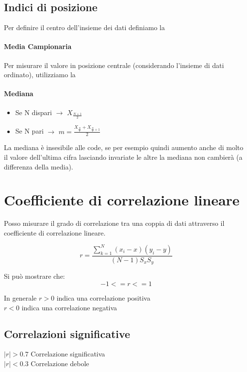 \documentclass[12pt, a4paper, openany]{book}
\begin{document}
\subsection{Indici di posizione}
Per definire il centro dell'insieme dei dati definiamo la 
\paragraph{\textbf{Media Campionaria}}  %

Per misurare il valore in posizione centrale (considerando l'insieme di dati ordinato), utilizziamo la
\paragraph{\textbf{Mediana}}
\begin{itemize}
    \item Se N dispari $\rightarrow$ {$X_\frac{N+1}{2}$}
    \item Se N pari $\rightarrow$ $m = \frac{X_{\frac{N}{2}}+X_{\frac{N}{2}+1}}{2}$
\end{itemize}

La mediana è insesibile alle code, se per esempio quindi aumento anche di molto il valore dell'ultima cifra lasciando invariate
le altre la mediana non cambierà (a differenza della media).

\section{Coefficiente di correlazione lineare}
Posso misurare il grado di correlazione tra una coppia di dati attraverso il coefficiente di correlazione lineare. 

\begin{equation}
    r = \frac{\sum_{k=1}^N (x_i - x)(y_i - y)}{(N -1)S_x S_y}
\end{equation}

Si può mostrare che:
\begin{equation}
    -1<=r<=1
\end{equation}

In generale $r > 0$ indica una correlazione positiva
\\ $r < 0$ indica una correlazione negativa 

\subsection{Correlazioni significative}
$|r| > 0.7$ Correlazione significativa
\\$|r| < 0.3$ Correlazione debole
\end{document}
